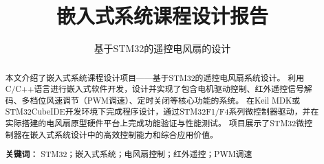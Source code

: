 \documentclass[12pt, a4paper]{ctexart}
\title{嵌入式系统课程设计报告}
\subtitle{基于STM32的遥控电风扇的设计}
\begin{document}
\makecover


\newpage
\begin{abstract}
本文介绍了嵌入式系统课程设计项目——基于STM32的遥控电风扇系统设计。
利用C/C++语言进行嵌入式软件开发，设计并实现了包含电机驱动控制、红外遥控信号解码、多档位风速调节（PWM调速）、定时关闭等核心功能的系统。
在Keil MDK或STM32CubeIDE开发环境下完成程序设计，通过STM32F1/F4系列微控制器驱动，并在实际搭建的电风扇原型硬件平台上完成功能验证与性能测试。
项目展示了STM32微控制器在嵌入式系统设计中的高效控制能力和综合应用价值。
\par
\textbf{关键词：} STM32；嵌入式系统；电风扇控制；红外遥控；PWM调速\end{abstract}
\clearpage

\tableofcontents
\clearpage

\setcounter{page}{1} %









\end{document}
